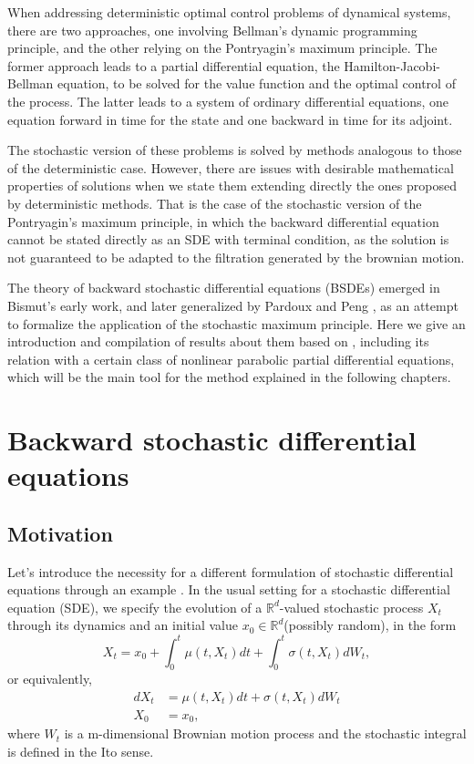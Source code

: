 \newcommand{\Sspa}{\mathbb{S}^2(0,T)}
\newcommand{\Hspa}{\mathbb{H}^2(0,T)^d}

When addressing deterministic optimal control problems of dynamical systems, there are two approaches, one involving Bellman's dynamic programming principle, and the other relying on the Pontryagin's maximum principle. The former approach leads to a partial differential equation, the Hamilton-Jacobi-Bellman equation, to be solved for the value function and the optimal control of the process. The latter leads to a system of ordinary differential equations, one equation forward in time for the state and one backward in time for its adjoint.

The stochastic version of these problems is solved by methods analogous to those of the deterministic case. However, there are issues with desirable mathematical properties of solutions when we state them extending directly the ones proposed by deterministic methods. That is the case of the stochastic version of the Pontryagin's maximum principle, in which the backward differential equation cannot be stated directly as an SDE with terminal condition, as the solution is not guaranteed to be adapted to the filtration generated by the brownian motion.

The theory of backward stochastic differential equations (BSDEs) emerged in Bismut's \cite{bismut_conjugate_1973} early work, and later generalized by Pardoux and Peng \cite{pardoux_adapted_1990}, as an attempt to formalize the application of the stochastic maximum principle. Here we give an introduction and compilation of results about them based on \cite{zhang_backward_2017,pardoux_stochastic_2014,romero_maestro_nodate,touzi_optimal_2013}, including its relation with a certain class of nonlinear parabolic partial differential equations, which will be the main tool for the method explained in the following chapters. 
\section{Backward stochastic differential equations}
\subsection{Motivation}
Let's introduce the necessity for a different formulation of stochastic differential equations through an example \cite{romero_maestro_nodate}. In the usual setting for a stochastic differential equation (SDE), we specify the evolution of a $\mathbb{R}^d$-valued stochastic process $X_t$ through its dynamics and an initial value $x_0\in \mathbb{R}^d$(possibly random), in the form
\begin{equation}
	X_t=x_0 +\int_{0}^{t}\mu(t,X_t)dt+\int_{0}^{t} \sigma(t,X_t) dW_t,
\end{equation}
or equivalently,
\begin{equation}
	\label{eqn:SDE}
	\begin{split}
		dX_t&=\mu(t,X_t)dt+\sigma(t,X_t)dW_t\\
		X_0&=x_0,
	\end{split}
\end{equation}
where $W_t$ is a m-dimensional Brownian motion process and the stochastic integral is defined in the Ito sense.

